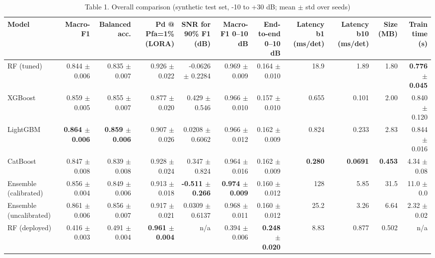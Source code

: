 \begin{table}[htbp]
\centering
\small
\caption{Table 1. Overall comparison (synthetic test set, -10 to +30 dB; mean $\pm$ std over seeds)}
\label{tab:table1_overall}
\begin{tabular}{lrrrrrrrrrr}
\toprule
Model & Macro-F1 & Balanced acc. & Pd @ Pfa=1\% (LORA) & SNR for 90\% F1 (dB) & Macro-F1 0–10 dB & End-to-end 0–10 dB & Latency b1 (ms/det) & Latency b10 (ms/det) & Size (MB) & Train time (s) \\
\midrule
RF (tuned) & 0.844 $\pm$ 0.006 & 0.835 $\pm$ 0.007 & 0.926 $\pm$ 0.022 & -0.0626 $\pm$ 0.2284 & 0.969 $\pm$ 0.009 & 0.164 $\pm$ 0.010 & 18.9 & 1.89 & 1.80 & \textbf{0.776 $\pm$ 0.045} \\
XGBoost & 0.859 $\pm$ 0.005 & 0.855 $\pm$ 0.007 & 0.877 $\pm$ 0.020 & 0.429 $\pm$ 0.546 & 0.966 $\pm$ 0.010 & 0.157 $\pm$ 0.010 & 0.655 & 0.101 & 2.00 & 0.840 $\pm$ 0.120 \\
LightGBM & \textbf{0.864 $\pm$ 0.006} & \textbf{0.859 $\pm$ 0.006} & 0.907 $\pm$ 0.026 & 0.0208 $\pm$ 0.6062 & 0.966 $\pm$ 0.012 & 0.162 $\pm$ 0.009 & 0.824 & 0.233 & 2.83 & 0.844 $\pm$ 0.016 \\
CatBoost & 0.847 $\pm$ 0.008 & 0.839 $\pm$ 0.008 & 0.928 $\pm$ 0.024 & 0.347 $\pm$ 0.824 & 0.964 $\pm$ 0.016 & 0.162 $\pm$ 0.009 & \textbf{0.280} & \textbf{0.0691} & \textbf{0.453} & 4.34 $\pm$ 0.08 \\
Ensemble (calibrated) & 0.856 $\pm$ 0.004 & 0.849 $\pm$ 0.006 & 0.913 $\pm$ 0.018 & \textbf{-0.511 $\pm$ 0.266} & \textbf{0.974 $\pm$ 0.009} & 0.160 $\pm$ 0.012 & 128 & 5.85 & 31.5 & 11.0 $\pm$ 0.0 \\
Ensemble (uncalibrated) & 0.861 $\pm$ 0.006 & 0.856 $\pm$ 0.007 & 0.917 $\pm$ 0.021 & 0.0309 $\pm$ 0.6137 & 0.968 $\pm$ 0.011 & 0.160 $\pm$ 0.012 & 25.2 & 3.26 & 6.64 & 2.32 $\pm$ 0.02 \\
RF (deployed) & 0.416 $\pm$ 0.003 & 0.491 $\pm$ 0.004 & \textbf{0.961 $\pm$ 0.004} & n/a & 0.394 $\pm$ 0.006 & \textbf{0.248 $\pm$ 0.020} & 8.83 & 0.877 & 0.502 & n/a \\
\bottomrule
\end{tabular}
\end{table}
